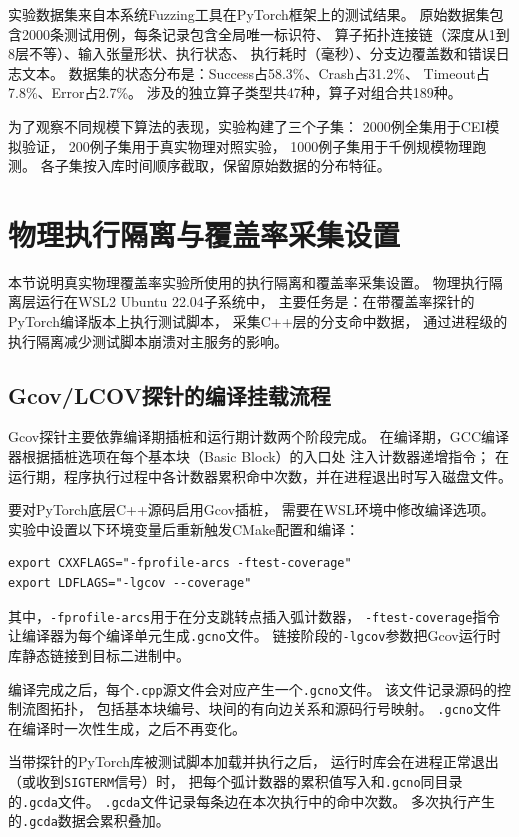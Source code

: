 实验数据集来自本系统Fuzzing工具在PyTorch框架上的测试结果。
原始数据集包含2000条测试用例，每条记录包含全局唯一标识符、
算子拓扑连接链（深度从1到8层不等）、输入张量形状、执行状态、
执行耗时（毫秒）、分支边覆盖数和错误日志文本。
数据集的状态分布是：Success占58.3\%、Crash占31.2\%、
Timeout占7.8\%、Error占2.7\%。
涉及的独立算子类型共47种，算子对组合共189种。

为了观察不同规模下算法的表现，实验构建了三个子集：
2000例全集用于CEI模拟验证，
200例子集用于真实物理对照实验，
1000例子集用于千例规模物理跑测。
各子集按入库时间顺序截取，保留原始数据的分布特征。

\section{物理执行隔离与覆盖率采集设置}

本节说明真实物理覆盖率实验所使用的执行隔离和覆盖率采集设置。
物理执行隔离层运行在WSL2 Ubuntu 22.04子系统中，
主要任务是：在带覆盖率探针的PyTorch编译版本上执行测试脚本，
采集C++层的分支命中数据，
通过进程级的执行隔离减少测试脚本崩溃对主服务的影响。

\subsection{Gcov/LCOV探针的编译挂载流程}

Gcov探针主要依靠编译期插桩和运行期计数两个阶段完成。
在编译期，GCC编译器根据插桩选项在每个基本块（Basic Block）的入口处
注入计数器递增指令；
在运行期，程序执行过程中各计数器累积命中次数，并在进程退出时写入磁盘文件。

要对PyTorch底层C++源码启用Gcov插桩，
需要在WSL环境中修改编译选项。
实验中设置以下环境变量后重新触发CMake配置和编译：

\begin{verbatim}
export CXXFLAGS="-fprofile-arcs -ftest-coverage"
export LDFLAGS="-lgcov --coverage"
\end{verbatim}

其中，\texttt{-fprofile-arcs}用于在分支跳转点插入弧计数器，
\texttt{-ftest-coverage}指令让编译器为每个编译单元生成\texttt{.gcno}文件。
链接阶段的\texttt{-lgcov}参数把Gcov运行时库静态链接到目标二进制中。

编译完成之后，每个\texttt{.cpp}源文件会对应产生一个\texttt{.gcno}文件。
该文件记录源码的控制流图拓扑，
包括基本块编号、块间的有向边关系和源码行号映射。
\texttt{.gcno}文件在编译时一次性生成，之后不再变化。

当带探针的PyTorch库被测试脚本加载并执行之后，
运行时库会在进程正常退出（或收到\texttt{SIGTERM}信号）时，
把每个弧计数器的累积值写入和\texttt{.gcno}同目录的\texttt{.gcda}文件。
\texttt{.gcda}文件记录每条边在本次执行中的命中次数。
多次执行产生的\texttt{.gcda}数据会累积叠加。

